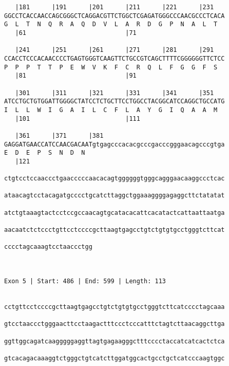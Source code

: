 \documentclass{article}
\begin{document}
\begin{Verbatim}
   |181      |191      |201      |211      |221      |231   
GGCCTCACCAACCAGCGGGCTCAGGACGTTCTGGCTCGAGATGGGCCCAACGCCCTCACA
G  L  T  N  Q  R  A  Q  D  V  L  A  R  D  G  P  N  A  L  T  
   |61                           |71                        
  
   |241      |251      |261      |271      |281      |291   
CCACCTCCCACAACCCCTGAGTGGGTCAAGTTCTGCCGTCAGCTTTTCGGGGGGTTCTCC
P  P  P  T  T  P  E  W  V  K  F  C  R  Q  L  F  G  G  F  S  
   |81                           |91                        
  
   |301      |311      |321      |331      |341      |351   
ATCCTGCTGTGGATTGGGGCTATCCTCTGCTTCCTGGCCTACGGCATCCAGGCTGCCATG
I  L  L  W  I  G  A  I  L  C  F  L  A  Y  G  I  Q  A  A  M  
   |101                          |111                       
  
   |361      |371      |381                                 
GAGGATGAACCATCCAACGACAATgtgagcccacacgcccgacccgggaacagcccgtga
E  D  E  P  S  N  D  N                                      
   |121                                                     
  
ctgtcctccaaccctgaacccccaacacagtggggggtgggcagggaacaaggccctcac
                                                            
ataacagtcctacagatgcccctgcatcttaggctggaaaggggagaggcttctatatat
                                                            
atctgtaaagtactcctccgccaacagtgcatacacattcacatactcattaattaatga
                                                            
aacaatctctccctgttcctccccgcttaagtgagcctgtctgtgtgcctgggtcttcat
                                                            
cccctagcaaagtcctaaccctgg
                        
                        
 
Exon 5 | Start: 486 | End: 599 | Length: 113


cctgttcctccccgcttaagtgagcctgtctgtgtgcctgggtcttcatcccctagcaaa
                                                            
gtcctaaccctgggaacttcctaagactttccctcccatttctagtcttaacaggcttga
                                                            
ggttggcagatcaagggggaggttagtgagaagggctttcccctaccatcatcactctca
                                                            
gtcacagacaaaggtctgggctgtcatcttggatggcactgcctgctcatcccaagtggc
                                                            

\end{Verbatim}
\end{document}
